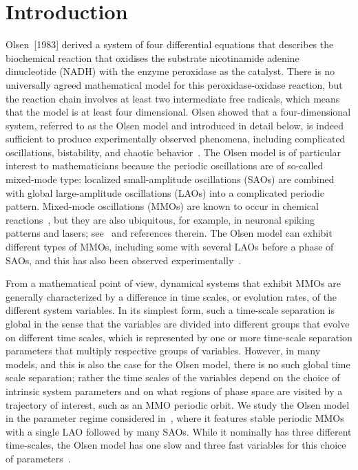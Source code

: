 \documentclass{ws-ijbc}
\begin{document}


\section{Introduction}
%
Olsen~[1983] derived a system of four differential equations that describes the biochemical reaction that oxidises the substrate nicotinamide adenine dinucleotide (NADH) with the enzyme peroxidase as the catalyst. There is no universally agreed mathematical model for this peroxidase-oxidase reaction, but the reaction chain involves at least two intermediate free radicals, which means that the model is at least four dimensional. Olsen showed that a four-dimensional system, referred to as the Olsen model and introduced in detail below, is indeed sufficient to produce experimentally observed phenomena, including complicated oscillations, bistability, and chaotic behavior~\cite{Olsen}. The Olsen model is of particular interest to mathematicians because the periodic oscillations are of so-called mixed-mode type: localized small-amplitude oscillations (SAOs) are combined with global large-amplitude oscillations (LAOs) into a complicated periodic pattern. Mixed-mode oscillations (MMOs) are known to occur in chemical reactions~\cite{BZ, BZ_reaction}, but they are also ubiquitous, for example, in neuronal spiking patterns and lasers; see~\cite{MMO} and references therein. The Olsen model can exhibit different types of MMOs, including some with several LAOs before a phase of SAOs, and this has also been observed experimentally~\cite{Olsen}.

From a mathematical point of view, dynamical systems that exhibit MMOs are generally characterized by a difference in time scales, or evolution rates, of the different system variables. In its simplest form, such a time-scale separation is global in the sense that the variables are divided into different groups that evolve on different time scales, which is represented by one or more time-scale separation parameters that multiply respective groups of variables. However, in many models, and this is also the case for the Olsen model, there is no such global time scale separation; rather the time scales of the variables depend on the choice of intrinsic system parameters and on what regions of phase space are visited by a trajectory of interest, such as an MMO periodic orbit.
We study the Olsen model in the parameter regime considered in~\cite{QSSA}, where it features stable periodic MMOs with a single LAO followed by many SAOs. While it nominally has three different time-scales, the Olsen model has one slow and three fast variables for this choice of parameters~\cite{Rescaling}. 
\end{document}
